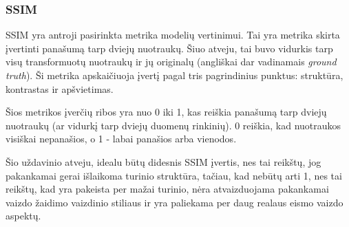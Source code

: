 \documentclass{VUMIFPSbakalaurinis}
\begin{document}
        \subsubsection{SSIM}
            SSIM \cite{SSIM} yra antroji pasirinkta metrika modelių vertinimui. Tai yra metrika skirta įvertinti panašumą tarp dviejų nuotraukų. Šiuo atveju, tai buvo vidurkis tarp visų transformuotų nuotraukų ir jų originalų (angliškai dar vadinamais \emph{ground truth}). Ši metrika apskaičiuoja įvertį pagal tris pagrindinius punktus: struktūra, kontrastas ir apšvietimas.

            Šios metrikos įverčių ribos yra nuo 0 iki 1, kas reiškia panašumą tarp dviejų nuotraukų (ar vidurkį tarp dviejų duomenų rinkinių). 0 reiškia, kad nuotraukos visiškai nepanašios, o 1 - labai panašios arba vienodos.

            Šio uždavinio atveju, idealu būtų didesnis SSIM įvertis, nes tai reikštų, jog pakankamai gerai išlaikoma turinio struktūra, tačiau, kad nebūtų arti 1, nes tai reikštų, kad yra pakeista per mažai turinio, nėra atvaizduojama pakankamai vaizdo žaidimo vaizdinio stiliaus ir yra paliekama per daug realaus eismo vaizdo aspektų. 
        
\end{document}

